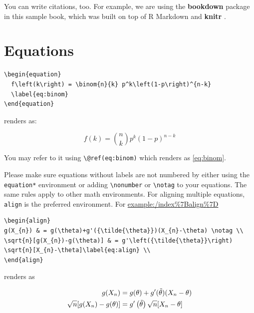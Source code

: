 \documentclass[
]{book}
\theoremstyle{definition}
\theoremstyle{definition}
\theoremstyle{definition}
\theoremstyle{remark}
\begin{document}
You can write citations, too. For example, we are using the \textbf{bookdown} package \citep{R-bookdown} in this sample book, which was built on top of R Markdown and \textbf{knitr} \citep{xie2015}.

\hypertarget{equations}{%
\section{Equations}\label{equations}}

\begin{verbatim}
\begin{equation} 
  f\left(k\right) = \binom{n}{k} p^k\left(1-p\right)^{n-k}
  \label{eq:binom}
\end{equation} 
\end{verbatim}

renders as:

\begin{equation} 
  f\left(k\right) = \binom{n}{k} p^k\left(1-p\right)^{n-k}
  \label{eq:binom}
\end{equation}

You may refer to it using \texttt{\textbackslash{}@ref(eq:binom)} which renders as \eqref{eq:binom}.

Please make sure equations  without labels are not numbered by either using the \texttt{equation*} environment or adding \texttt{\textbackslash{}nonumber} or \texttt{\textbackslash{}notag} to your equations. The same rules apply to other math environments. For aligning multiple equations, \texttt{align} is the preferred environment. For \url{example:/index\%7Balign\%7D}

\begin{verbatim}
\begin{align} 
g(X_{n}) & = g(\theta)+g'({\tilde{\theta}})(X_{n}-\theta) \notag \\
\sqrt{n}[g(X_{n})-g(\theta)] & = g'\left({\tilde{\theta}}\right) 
\sqrt{n}[X_{n}-\theta]\label{eq:align} \\
\end{align} 
\end{verbatim}

renders as

\begin{align} 
g(X_{n}) & = g(\theta)+g'({\tilde{\theta}})(X_{n}-\theta) \notag \\
\sqrt{n}[g(X_{n})-g(\theta)] & = g'\left({\tilde{\theta}}\right) 
\sqrt{n}[X_{n}-\theta]\label{eq:align} \\
\end{align}
\end{document}
